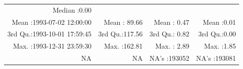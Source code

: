 \documentclass[
  10pt,
  a4paper,oneside]{article}
\begin{document}
\begin{longtable}[]{@{}rrrr@{}}
\begin{minipage}[t]{0.18\columnwidth}
Median :0.00\strut
\end{minipage}\tabularnewline
\begin{minipage}[t]{0.34\columnwidth}\raggedleft
Mean :1993-07-02 12:00:00\strut
\end{minipage} & \begin{minipage}[t]{0.19\columnwidth}\raggedleft
Mean : 89.66\strut
\end{minipage} & \begin{minipage}[t]{0.18\columnwidth}\raggedleft
Mean : 0.47\strut
\end{minipage} & \begin{minipage}[t]{0.18\columnwidth}\raggedleft
Mean :0.01\strut
\end{minipage}\tabularnewline
\begin{minipage}[t]{0.34\columnwidth}\raggedleft
3rd Qu.:1993-10-01 17:59:45\strut
\end{minipage} & \begin{minipage}[t]{0.19\columnwidth}\raggedleft
3rd Qu.:117.56\strut
\end{minipage} & \begin{minipage}[t]{0.18\columnwidth}\raggedleft
3rd Qu.: 0.82\strut
\end{minipage} & \begin{minipage}[t]{0.18\columnwidth}\raggedleft
3rd Qu.:0.00\strut
\end{minipage}\tabularnewline
\begin{minipage}[t]{0.34\columnwidth}\raggedleft
Max. :1993-12-31 23:59:30\strut
\end{minipage} & \begin{minipage}[t]{0.19\columnwidth}\raggedleft
Max. :162.81\strut
\end{minipage} & \begin{minipage}[t]{0.18\columnwidth}\raggedleft
Max. : 2.89\strut
\end{minipage} & \begin{minipage}[t]{0.18\columnwidth}\raggedleft
Max. :1.85\strut
\end{minipage}\tabularnewline
\begin{minipage}[t]{0.34\columnwidth}\raggedleft
NA\strut
\end{minipage} & \begin{minipage}[t]{0.19\columnwidth}\raggedleft
NA\strut
\end{minipage} & \begin{minipage}[t]{0.18\columnwidth}\raggedleft
NA's :193052\strut
\end{minipage} & \begin{minipage}[t]{0.18\columnwidth}\raggedleft
NA's :193081\strut
\end{minipage}\tabularnewline
\bottomrule
\end{longtable}
\end{document}
